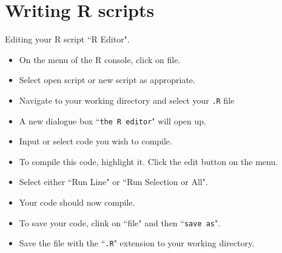 


\section{Writing R scripts}
Editing your R script ``R Editor".
\begin{itemize}
	\item On the menu of the R console, click on file.
	\item Select open script or new script as appropriate.
	\item Navigate to your working directory and select your \texttt{.R} file
	\item A new dialogue box ``\texttt{the R editor}" will open up.
	\item Input or select code you wish to compile.
	\item To compile this code, highlight it. Click the edit button on the menu.
	\item Select either ``Run Line" or ``Run Selection or All".
	\item Your code should now compile.
	\item To save your code, clink on ``file" and then ``\texttt{save as}".
	\item Save the file with the ``\texttt{.R}" extension to your working directory.
\end{itemize}


\begin{framed}
\begin{verbatim}


\end{verbatim}
\end{framed}

